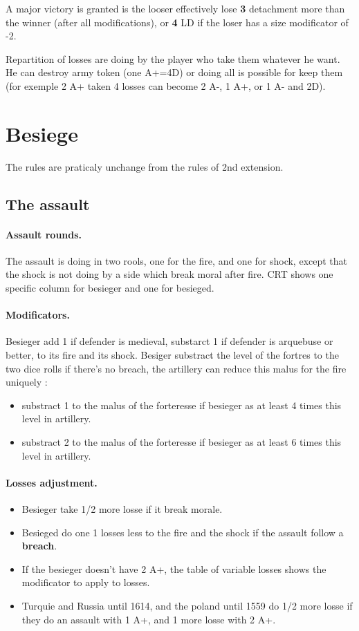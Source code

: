 A {\bg major victory} is granted is the looser effectively lose   
\textbf{3} detachment more than the winner (after all 
modifications), or \textbf{4} LD if the loser has a size modificator of -2.

Repartition of losses are doing by the player who take them whatever he 
want. He can destroy army token (one A+=4D) or doing all 
is possible for keep them (for exemple 2 A+ taken 4 losses can become 2 A-,
1 A+, or 1 A- and 2D).

\section{Besiege}
The rules are praticaly unchange from the rules of 2nd extension.

\subsection{The assault}

\paragraph{Assault rounds.}
The assault is doing in two rools, one for the fire, and one for shock, 
except that the shock is not doing by a side which break
moral after fire. CRT shows one specific column for besieger and one for
besieged.

\paragraph{Modificators.}
Besieger add 1 if defender is medieval, substarct 1 if defender is  
arquebuse or better, to its fire and its shock.
Besiger substract the level of the fortres to the two dice rolls if
there's no breach, the artillery can reduce this malus for
the fire uniquely :
\begin{itemize}
\item substract 1 to the malus of the forteresse if besieger as at least 4 times this level in artillery.
\item substract 2 to the malus of the forteresse if besieger as at least 6 times this level in artillery.
\end{itemize}

\paragraph{Losses adjustment.}
\begin{itemize}
\item Besieger take 1/2 more losse if it break morale.
\item Besieged do one 1 losses less to the fire and the shock if the
assault follow a \textbf{breach}.
\item If the besieger doesn't have 2 A+, the table of variable losses
shows the modificator to apply to losses.
\item Turquie and Russia until 1614, and the poland until 1559 do 1/2 more 
losse if they do an assault with 1 A+, and 1 more losse
with 2 A+.
\end{itemize}

